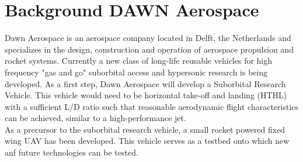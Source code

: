 \chapter{Background DAWN Aerospace}
Dawn Aerospace is an aerospace company located in Delft, the Netherlands and specializes in the design, construction and operation of aerospace propulsion and rocket systems. Currently a new class of long-life reusable vehicles for high frequency "gas and go" suborbital access and hypersonic research is being developed. As a first step, Dawn Aerospace will develop a Suborbital Research Vehicle. This vehicle would need to be horizontal take-off and landing (HTHL) with a sufficient L/D ratio such that reasonable aerodynamic flight characteristics can be achieved, similar to a high-performance jet. \\

As a precursor to the suborbital research vehicle, a small rocket powered fixed wing UAV has been
developed. This vehicle serves as a testbed onto which new anf future technologies can be tested.

